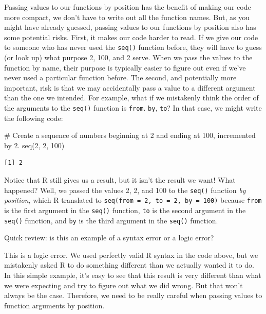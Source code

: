 \documentclass[
  letterpaper,
  DIV=11,
  numbers=noendperiod]{scrreprt}
\newenvironment{Shaded}{\begin{snugshade}}{\end{snugshade}}
\newcommand{\CommentTok}[1]{\textcolor[rgb]{0.37,0.37,0.37}{#1}}
\newcommand{\DecValTok}[1]{\textcolor[rgb]{0.68,0.00,0.00}{#1}}
\newcommand{\FunctionTok}[1]{\textcolor[rgb]{0.28,0.35,0.67}{#1}}
\newcommand{\NormalTok}[1]{\textcolor[rgb]{0.00,0.23,0.31}{#1}}
\begin{document}
Passing values to our functions by position has the benefit of making
our code more compact, we don't have to write out all the function
names. But, as you might have already guessed, passing values to our
functions by position also has some potential risks. First, it makes our
code harder to read. If we give our code to someone who has never used
the \texttt{seq()} function before, they will have to guess (or look up)
what purpose 2, 100, and 2 serve. When we pass the values to the
function by name, their purpose is typically easier to figure out even
if we've never used a particular function before. The second, and
potentially more important, risk is that we may accidentally pass a
value to a different argument than the one we intended. For example,
what if we mistakenly think the order of the arguments to the
\texttt{seq()} function is \texttt{from}. \texttt{by}, \texttt{to}? In
that case, we might write the following code:

\begin{Shaded}
\begin{Highlighting}[]
\CommentTok{\# Create a sequence of numbers beginning at 2 and ending at 100, incremented by 2.}
\FunctionTok{seq}\NormalTok{(}\DecValTok{2}\NormalTok{, }\DecValTok{2}\NormalTok{, }\DecValTok{100}\NormalTok{)}
\end{Highlighting}
\end{Shaded}

\begin{verbatim}
[1] 2
\end{verbatim}

Notice that R still gives us a result, but it isn't the result we want!
What happened? Well, we passed the values 2, 2, and 100 to the
\texttt{seq()} function \emph{by position}, which R translated to
\texttt{seq(from\ =\ 2,\ to\ =\ 2,\ by\ =\ 100)} because \texttt{from}
is the first argument in the \texttt{seq()} function, \texttt{to} is the
second argument in the \texttt{seq()} function, and \texttt{by} is the
third argument in the \texttt{seq()} function.

Quick review: is this an example of a syntax error or a logic error?

This is a logic error. We used perfectly valid R syntax in the code
above, but we mistakenly asked R to do something different than we
actually wanted it to do. In this simple example, it's easy to see that
this result is very different than what we were expecting and try to
figure out what we did wrong. But that won't always be the case.
Therefore, we need to be really careful when passing values to function
arguments by position.
\end{document}
